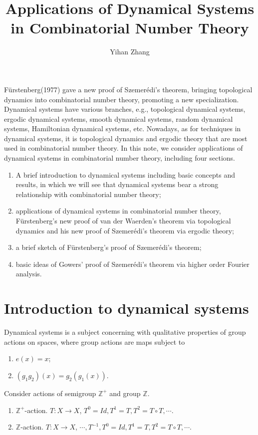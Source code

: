 \documentclass[12pt]{article}
\begin{document}
\title{Applications of Dynamical Systems in Combinatorial Number Theory}
\author{Yihan Zhang}
\maketitle

\tableofcontents
\bigskip
F\"urstenberg(1977) gave a new proof of Szemer\'edi's theorem, bringing topological dynamics into combinatorial number theory, promoting a new specialization. Dynamical systems have various branches, e.g., topological dynamical systems, ergodic dynamical systems, smooth dynamical systems, random dynamical systems, Hamiltonian dynamical systems, etc. Nowadays, as for techniques in dynamical systems, it is topological dynamics and ergodic theory that are most used in combinatorial number theory. In this note, we consider applications of dynamical systems in combinatorial number theory, including four sections.
\begin{enumerate} 
	\item A brief introduction to dynamical systems including basic concepts and results, in which we will see that dynamical systems bear a strong relationship with combinatorial number theory; 
	\item applications of dynamical systems in combinatorial number theory, F\"urstenberg's new proof of van der Waerden's theorem via topological dynamics and his new proof of Szemer\'edi's theorem via ergodic theory; 
	\item a brief sketch of F\"urstenberg's proof of Szemer\'edi's theorem; 
	\item basic ideas of Gowers' proof of Szemer\'edi's theorem via higher order Fourier analysis. 
\end{enumerate}

\section{Introduction to dynamical systems}
Dynamical systems is a subject concerning with qualitative properties of group actions on spaces, where group actions are maps subject to \begin{enumerate}\item $e(x)=x $; \item $(g_1g_2)(x)=g_2(g_1(x)) $. \end{enumerate} Consider actions of semigroup $\mathbb{Z}^+ $ and group $\mathbb{Z} $. \begin{enumerate} \item $\mathbb{Z}^+ $-action. $ T:X \to X $, $T^0=Id, T^1=T, T^2=T\circ T, \cdots $. \item $\mathbb{Z} $-action. $T:X \to X $, $\cdots, T^{-1}, T^0=Id, T^1=T, T^2=T\circ T, \cdots $. \end{enumerate}
\end{document}

